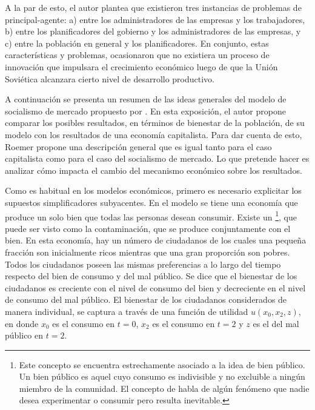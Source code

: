 A la par de esto, el autor plantea que existieron tres instancias de problemas de principal-agente: a) entre los administradores de las empresas y los trabajadores, b) entre los planificadores del gobierno y los administradores de las empresas, y c) entre la población en general y los planificadores. En conjunto, estas características y problemas, ocasionaron que no existiera un proceso de innovación que impulsara el crecimiento económico luego de que la Unión Soviética alcanzara cierto nivel de desarrollo productivo.



A continuación se presenta un resumen de las ideas generales del modelo de socialismo de mercado propuesto por \citet[§8]{Roemer_1994}. En esta exposición, el autor propone comparar los posibles resultados, en términos de bienestar de la población, de su modelo con los resultados de una economía capitalista. Para dar cuenta de esto, Roemer propone una descripción general que es igual tanto para el caso capitalista como para el caso del socialismo de mercado. Lo que pretende hacer es analizar cómo impacta el cambio del mecanismo económico sobre los resultados.

Como es habitual en los modelos económicos, primero es necesario explicitar los supuestos simplificadores subyacentes. En el modelo se tiene una economía que produce un solo bien que todas las personas desean consumir. Existe un \footnote{Este concepto se encuentra estrechamente asociado a la idea de bien público. Un bien público es aquel cuyo consumo es indivisible y no excluible a ningún miembro de la comunidad. El concepto de  habla de algún fenómeno que nadie desea experimentar o consumir pero resulta inevitable.}, que puede ser visto como la contaminación, que se produce conjuntamente con el bien. En esta economía, hay un número de ciudadanos de los cuales una pequeña fracción son inicialmente ricos mientras que una gran proporción son pobres. Todos los ciudadanos poseen las mismas preferencias a lo largo del tiempo respecto del bien de consumo y del mal público. Se dice que el bienestar de los ciudadanos es creciente con el nivel de consumo del bien y decreciente en el nivel de consumo del mal público. El bienestar de los ciudadanos considerados de manera individual, se captura a través de una función de utilidad $u(x_0,x_2,z)$, en donde $x_0$ es el consumo en $t=0$, $x_2$ es el consumo en $t=2$ y $z$ es el  del mal público en $t=2$.

